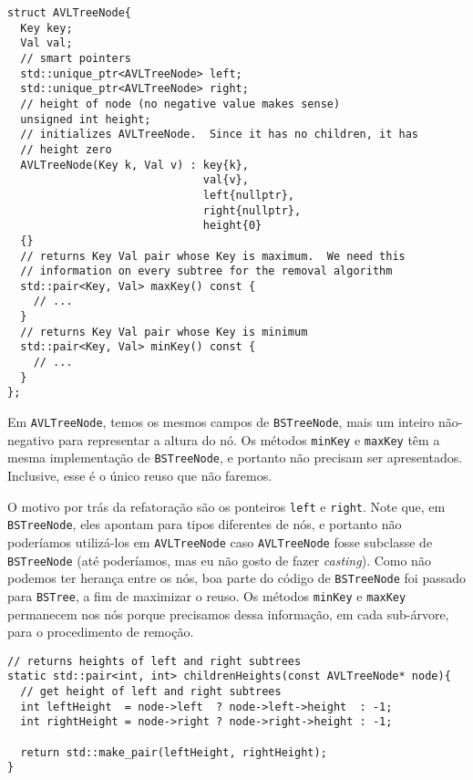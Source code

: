 \documentclass[11pt]{article}
\begin{document}
\pagebreak

\begin{verbatim}
struct AVLTreeNode{
  Key key;
  Val val;
  // smart pointers
  std::unique_ptr<AVLTreeNode> left;
  std::unique_ptr<AVLTreeNode> right;
  // height of node (no negative value makes sense)
  unsigned int height;
  // initializes AVLTreeNode.  Since it has no children, it has
  // height zero
  AVLTreeNode(Key k, Val v) : key{k},
                              val{v},
                              left{nullptr},
                              right{nullptr},
                              height{0}
  {}
  // returns Key Val pair whose Key is maximum.  We need this
  // information on every subtree for the removal algorithm
  std::pair<Key, Val> maxKey() const {
    // ...
  }
  // returns Key Val pair whose Key is minimum
  std::pair<Key, Val> minKey() const {
    // ...
  }
};
\end{verbatim}

Em \texttt{AVLTreeNode}, temos os mesmos campos de \texttt{BSTreeNode}, mais um
inteiro não-negativo para representar a altura do nó.  Os métodos
\texttt{minKey} e \texttt{maxKey} têm a mesma implementação de \texttt{BSTreeNode}, e
portanto não precisam ser apresentados.  Inclusive, esse é o único
reuso que não faremos.

O motivo por trás da refatoração são os ponteiros \texttt{left} e
\texttt{right}.  Note que, em \texttt{BSTreeNode}, eles apontam para tipos
diferentes de nós, e portanto não poderíamos utilizá-los em
\texttt{AVLTreeNode} caso \texttt{AVLTreeNode} fosse subclasse de \texttt{BSTreeNode}
(até poderíamos, mas eu não gosto de fazer \emph{casting}).  Como não
podemos ter herança entre os nós, boa parte do código de
\texttt{BSTreeNode} foi passado para \texttt{BSTree}, a fim de maximizar o
reuso.  Os métodos \texttt{minKey} e \texttt{maxKey} permanecem nos nós porque
precisamos dessa informação, em cada sub-árvore, para o
procedimento de remoção.

\pagebreak

\begin{verbatim}
// returns heights of left and right subtrees
static std::pair<int, int> childrenHeights(const AVLTreeNode* node){
  // get height of left and right subtrees
  int leftHeight  = node->left  ? node->left->height  : -1;
  int rightHeight = node->right ? node->right->height : -1;

  return std::make_pair(leftHeight, rightHeight);
}
\end{verbatim}
\end{document}
